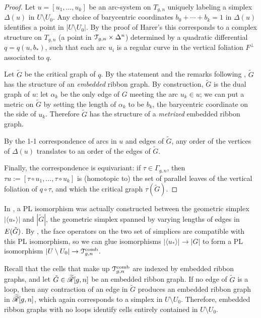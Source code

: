 \begin{proof}
  Let $u = [u_1, \ldots, u_k]$ be an arc-system on $T_{g,n}$ uniquely
  labeling a simplex $\Delta(u)$ in $U \setminus U_0$.  Any choice of barycentric
  coordinates $b_0 + \cdots + b_k = 1$ in $\Delta(u)$ identifies a point in $|U
  \setminus U_0|$.  By the proof of Harer's  this corresponds to
  a complex structure on $T_{g,n}$ (a point in $\mathcal{T}_{g,n} \times \Delta^n$)
  determined by a quadratic differential $q = q(u, b_*)$, such that
  each arc $u_i$ is a regular curve in the vertical foliation $F^\perp$
  associated to $q$.

  Let ${\tilde G}$ be the critical graph of $q$.  By the statement and
  the remarks following , ${\tilde G}$ has the
  structure of an \emph{embedded} ribbon graph.  By construction,
  ${\tilde G}$ is the dual graph of $u$: let $\alpha_k$ be the only edge of
  $G$ meeting the arc $u_k \in u$; we can put a metric on ${\tilde G}$
  by setting the length of $\alpha_k$ to be $b_k$, the barycentric
  coordinate on the side of $u_k$.  Therefore ${\tilde G}$ has the
  structure of a \emph{metrized} embedded ribbon graph.

  By the 1-1 correspondence of arcs in $u$ and edges of ${\tilde G}$,
  any order of the vertices of $\Delta(u)$ translates to an order of the
  edges of ${\tilde G}$.

  Finally, the correspondence is equivariant: if $\tau \in \Gamma_{g,n}$, then
  $\tau u := [\tau \circ u_1, \ldots, \tau \circ u_k]$ is (homotopic to) the set of parallel
  leaves of the vertical foliation of $q \circ \tau$, and which the critical
  graph $\tau({\tilde G})$.
\end{proof}


In , a PL isomorphism was actually constructed
between the geometric simplex $|\langle u_*\rangle|$ and $|{\tilde G}|$, the
geometric simplex spanned by varying lengths of edges in
$E(\tilde G)$.  By , the face
operators on the two set of simplices are compatible with this PL
isomorphism, so we can glue isomorphisms $|\langle u_*\rangle| \to |G|$ to form a PL
isomorphism $|U \setminus U_0| \to \mathcal{T}\sp{\text{comb}}_{g,n}$.

Recall that the cells that make up $\mathcal{T}\sp{\text{comb}}_{g,n}$ are indexed by
embedded ribbon graphs, and let ${\tilde G} \in \mathscr{\widetilde R}[g,n]$ be an embedded
ribbon graph. If no edge of ${\tilde G}$ is a loop, then any contraction
of an edge in ${\tilde G}$ produces an embedded ribbon graph in
$\mathscr{\widetilde R}[g,n]$, which again corresponds to a simplex in $U \setminus U_0$.
Therefore, embedded ribbon graphs with no loops identify cells
entirely contained in $U \setminus U_0$. 

